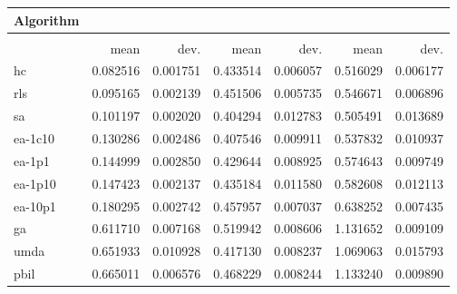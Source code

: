 \begin{tabular}{@{} l *{6}{>{{}}N{1}{2}} @{}}
\toprule
{Algorithm} &  \\
\midrule
&  &  &  \\
\midrule
& {mean} & {dev.} & {mean} & {dev.} & {mean} & {dev.} \\
\midrule
hc & 0.082516 & 0.001751 & 0.433514 & 0.006057 & 0.516029 & 0.006177 \\
rls & 0.095165 & 0.002139 & 0.451506 & 0.005735 & 0.546671 & 0.006896 \\
sa & 0.101197 & 0.002020 & 0.404294 & 0.012783 & 0.505491 & 0.013689 \\
ea-1c10 & 0.130286 & 0.002486 & 0.407546 & 0.009911 & 0.537832 & 0.010937 \\
ea-1p1 & 0.144999 & 0.002850 & 0.429644 & 0.008925 & 0.574643 & 0.009749 \\
ea-1p10 & 0.147423 & 0.002137 & 0.435184 & 0.011580 & 0.582608 & 0.012113 \\
ea-10p1 & 0.180295 & 0.002742 & 0.457957 & 0.007037 & 0.638252 & 0.007435 \\
ga & 0.611710 & 0.007168 & 0.519942 & 0.008606 & 1.131652 & 0.009109 \\
umda & 0.651933 & 0.010928 & 0.417130 & 0.008237 & 1.069063 & 0.015793 \\
pbil & 0.665011 & 0.006576 & 0.468229 & 0.008244 & 1.133240 & 0.009890 \\
\bottomrule
\end{tabular}
